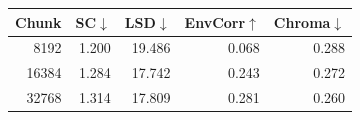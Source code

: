 \begin{tabular}{rrrrr}
\toprule
Chunk & SC$\downarrow$ & LSD$\downarrow$ & EnvCorr$\uparrow$ & Chroma$\downarrow$ \\
\midrule
8192 & 1.200 & 19.486 & 0.068 & 0.288 \\
16384 & 1.284 & 17.742 & 0.243 & 0.272 \\
32768 & 1.314 & 17.809 & 0.281 & 0.260 \\
\bottomrule
\end{tabular}
